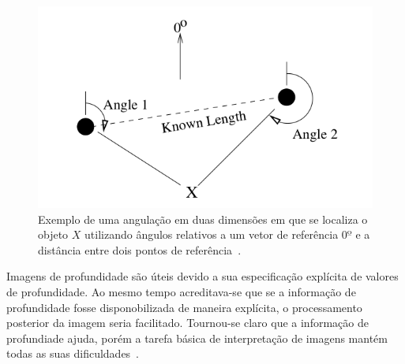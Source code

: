 	\begin{figure}[hbt]
		\begin{center}
			\includegraphics[scale=0.5]{figuras/2.FundamentacaoTeorica/angulation.png}
		\end{center}
		\caption{Exemplo de uma angulação em duas dimensões em que se localiza o objeto $\displaystyle X$ utilizando ângulos relativos a um vetor de referência $\displaystyle 0º$ e a distância entre dois pontos de referência~\cite{triangulacao}.}
		\label{angulation}
	\end{figure}


	Imagens de profundidade são úteis devido a sua especificação explícita de valores de profundidade. Ao mesmo tempo acreditava-se que se a informação de profundidade fosse disponobilizada de maneira explícita, o processamento posterior da imagem seria facilitado. Tournou-se claro que a informação de profundiade ajuda, porém a tarefa básica de interpretação de imagens mantém todas as suas dificuldades~\cite{jain}.

